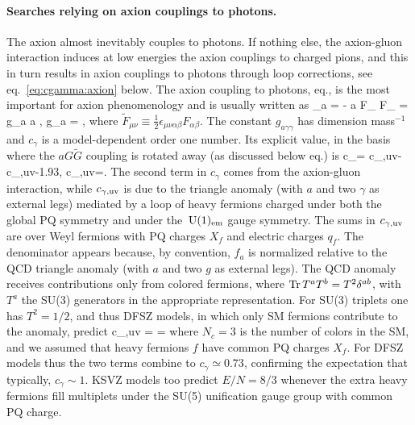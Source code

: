 \paragraph{Searches relying on axion couplings to photons.} 
The axion almost inevitably couples to photons. If nothing else, the axion-gluon interaction induces at low energies the axion couplings to charged pions, and this in turn results in axion couplings to photons through loop corrections, see eq.~\eqref{eq:cgamma:axion} below. 
The axion coupling to photons, eq.,  is the most important for axion phenomenology and is usually written as
\beq 
\Lag_{a\gamma\gamma} = 
-  a F_{\mu\nu} \tilde F_{\mu\nu} = g_{a\gamma\gamma} a \cdot{},\qquad
\qquad
g_{a\gamma\gamma} = ,
\label{eq:gagammagamma}
\eeq
where $\tilde F_{\mu\nu} \equiv \frac{1}{2}\epsilon_{\mu\nu\alpha\beta}F_{\alpha \beta}$.
The constant $ g_{a\gamma\gamma}$ has dimension mass$^{-1}$ and
$c_\gamma$ is a model-dependent order one number.  Its explicit value, in the basis where the $aG\tilde G$ coupling
is rotated away (as discussed below eq.) is 
\beq 
\label{eq:cgamma:axion}
c_\gamma = c_{\gamma,{\rm uv}}-
\approx c_{\gamma,{\rm uv}}-1.93, 
\qquad {} \qquad
 c_{\gamma,{\rm uv}}=.
\eeq
The second term in $c_\gamma$ comes from the axion-gluon interaction, while $c_{\gamma,{\rm uv}}$ is due to the triangle anomaly (with $a$ and two $\gamma$ as external legs) mediated by a loop of heavy  fermions charged 
under both the global PQ symmetry and under the $\,{\rm U}(1)_{\rm em}$ gauge symmetry. 
The sums in $c_{\gamma,{\rm uv}}$ are over Weyl fermions with PQ charges $X_f$ and electric charges $q_f$.
The denominator appears because, by convention, $f_a$ is normalized relative to the QCD triangle anomaly (with $a$ and two $g$ as external legs). 
The QCD anomaly receives contributions only from colored fermions, where $\hbox{Tr}\, T^a T^b = T^2\delta^{ab}$, with $T^a$ the SU(3) generators in the appropriate representation. 
For SU(3) triplets one has $T^2=1/2$, and thus
DFSZ models, in which only SM fermions contribute to the anomaly, predict
\beq  c_{\gamma,{\rm uv}}
= = \eeq
where $N_c=3$ is the number of colors in the SM, and we assumed that heavy fermions $f$ have common PQ charges $X_f$. 
For DFSZ models thus the two terms combine to $c_\gamma\simeq 0.73$, confirming the expectation that typically, $c_\gamma\sim 1$. 
KSVZ models too predict $E/N=8/3$ whenever the extra heavy fermions fill multiplets under the SU(5) unification gauge group
with common PQ charge.

